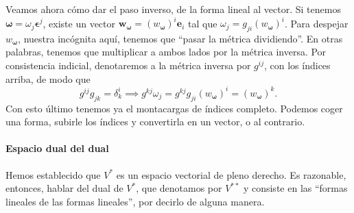 \begin{example}
    Veamos ahora cómo dar el paso inverso, de la forma lineal al vector. Si tenemos \(\boldsymbol{\omega} = \omega_j \boldsymbol{\epsilon}^j\), existe un vector \(\mathbf{w}_{\boldsymbol{\omega}}=(w_{\boldsymbol{\omega}})^i\mathbf{e}_i\) tal que \(\omega_j = g_{ji}(w_{\boldsymbol{\omega}})^i\). Para despejar \(w_{\boldsymbol{\omega}}\), nuestra incógnita aquí, tenemos que ``pasar la métrica dividiendo''. En otras palabras, tenemos que multiplicar a ambos lados por la métrica inversa. Por consistencia indicial, denotaremos a la métrica inversa por \(g^{ij}\), con los índices arriba, de modo que 
    \begin{equation}
        g^{ij}g_{jk} = \delta^i_k \implies g^{kj}\omega_j = g^{kj}g_{ji}(w_{\boldsymbol{\omega}})^i = (w_{\boldsymbol{\omega}})^k.
    \end{equation}
    Con esto último tenemos ya el montacargas de índices completo. Podemos coger una forma, subirle los índices y convertirla en un vector, o al contrario. 
\end{example}

\paragraph{Espacio dual del dual} Hemos establecido que \(V^*\) es un espacio vectorial de pleno derecho. Es razonable, entonces, hablar del dual de \(V^*\), que denotamos por \(V^{**}\) y consiste en las ``formas lineales de las formas lineales'', por decirlo de alguna manera. 

